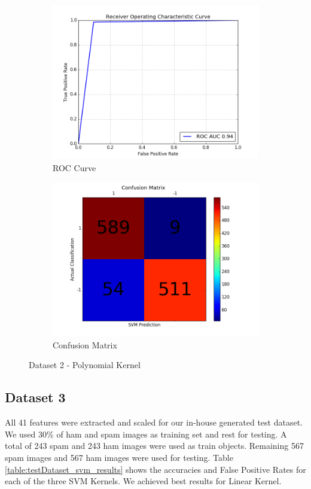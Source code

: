 \begin{figure}[h]
	
	\begin{subfigure}{0.5\textwidth}
		\includegraphics[width=0.9\linewidth]{images/AUC-Dataset2-poly} 
		\caption{ROC Curve}
		\label{fig:AUC_Dataset2_poly}
	\end{subfigure}
	\begin{subfigure}{0.5\textwidth}
		\includegraphics[width=0.9\linewidth]{images/CM-Dataset2-poly}
		\caption{Confusion Matrix}
		\label{fig:CM_Dataset2_poly}
	\end{subfigure}
	
	\caption{Dataset 2 - Polynomial Kernel}
	\label{fig:Dataset2_poly_results}
\end{figure}




\subsection{Dataset 3}
\par All 41 features were extracted and scaled for our in-house generated test dataset. We used 30\% of ham and spam images as training set and rest for testing. A total of 243 spam and 243 ham images were used as train objects. Remaining 567 spam images and 567 ham images were used for testing. Table \ref{table:testDataset_svm_results} shows the accuracies and False Positive Rates for each of the three SVM Kernels. We achieved best results for Linear Kernel.


